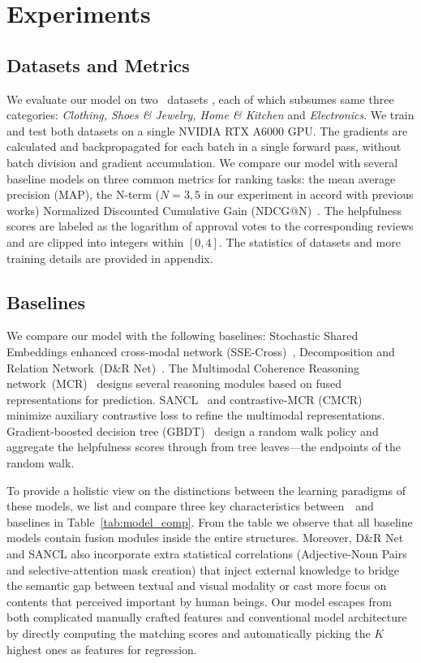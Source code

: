 


\section{Experiments}
\subsection{Datasets and Metrics}
We evaluate our model on two \taskabbrname~datasets \citep{liu2021multi}, each of which subsumes same three categories: \textit{Clothing, Shoes \& Jewelry, Home \& Kitchen} and \textit{Electronics}. We train and test both datasets on a single NVIDIA RTX A6000 GPU.
The gradients are calculated and backpropagated for each batch in a single forward pass, without batch division and gradient accumulation.
We compare our model with several baseline models on three common metrics for ranking tasks: the mean average precision (MAP), the N-term ($N=3,5$ in our experiment in accord with previous works) Normalized Discounted Cumulative Gain (NDCG@N)~\citep{jarvelin2017ir, diaz2018modeling}.
The helpfulness scores are labeled as the logarithm of approval votes to the corresponding reviews and are clipped into integers within $[0,4]$. 
The statistics of datasets and more training details are provided in appendix.


\subsection{Baselines}
We compare our model with the following baselines: Stochastic Shared Embeddings enhanced cross-modal network (SSE-Cross)~\cite{abavisani2020multimodal}, Decomposition and Relation Network~(D\&R Net)~\cite{xu2020reasoning}. The Multimodal Coherence Reasoning network~(MCR)~\cite{liu2021multi} designs several reasoning modules based on fused representations for prediction. SANCL~\cite{han-etal-2022-sancl} and contrastive-MCR (CMCR)~\cite{nguyen-etal-2022-adaptive} minimize auxiliary contrastive loss to refine the multimodal representations. 
Gradient-boosted decision tree (GBDT)~\cite{nguyen2023gradient} design a random walk policy and aggregate the helpfulness scores through from tree leaves---the endpoints of the random walk.

To provide a holistic view on the distinctions between the learning paradigms of these models, we list and compare three key characteristics between~\modelname~and baselines in Table~\ref{tab:model_comp}.
From the table we observe that all baseline models contain fusion modules inside the entire structures.
Moreover, D\&R Net and SANCL also incorporate extra statistical correlations (Adjective-Noun Pairs and selective-attention mask creation) that inject external knowledge to bridge the semantic gap between textual and visual modality or cast more focus on contents that perceived important by human beings.
Our model escapes from both complicated manually crafted features and conventional model architecture by directly computing the matching scores and automatically picking the $K$ highest ones as features for regression. 

